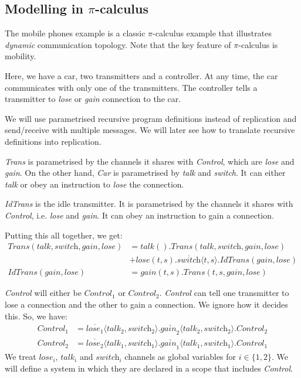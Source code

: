 \documentclass[a4paper, openany]{memoir}
\theoremstyle{definition}
\begin{document}
    \subsection{Modelling in $\pi$-calculus}
    The mobile phones example is a classic $\pi$-calculus example that illustrates \emph{dynamic} communication topology. Note that the key feature of $\pi$-calculus is mobility.

    Here, we have a car, two transmitters and a controller. At any time, the car communicates with only one of the transmitters. The controller tells a transmitter to \textit{lose} or \textit{gain} connection to the car.


    We will use parametrised recursive program definitions instead of replication and send/receive with multiple messages. We will later see how to translate recursive definitions into replication. 
    
    \textit{Trans} is parametrised by the channels it shares with \textit{Control}, which are \textit{lose} and \textit{gain}. On the other hand, \textit{Car} is parametrised by \textit{talk} and \textit{switch}. It can either \textit{talk} or obey an instruction to \textit{lose} the connection.

    \textit{IdTrans} is the idle transmitter. It is parametrised by the channels it shares with \textit{Control}, i.e. \textit{lose} and \textit{gain}. It can obey an instruction to gain a connection.

    Putting this all together, we get:
    \begin{align*}
        \textit{Trans}(\textit{talk}, \textit{switch}, \textit{gain}, \textit{lose}) &= \textit{talk}().\textit{Trans}(\textit{talk}, \textit{switch}, \textit{gain}, \textit{lose}) \\
        &+ \textit{lose}(t, s).\overline{\textit{switch}}\langle t, s \rangle.\textit{IdTrans}(\textit{gain}, \textit{lose}) \\
        \textit{IdTrans}(\textit{gain}, \textit{lose}) &= \textit{gain}(t, s).\textit{Trans}(t, s, \textit{gain}, \textit{lose})
    \end{align*}

    \textit{Control} will either be $\textit{Control}_1$ or $\textit{Control}_2$. \textit{Control} can tell one transmitter to lose a connection and the other to gain a connection. We ignore how it decides this. So, we have:
    \begin{align*}
        \textit{Control}_1 &= \overline{\textit{lose}_1} \langle \textit{talk}_2, \textit{switch}_2 \rangle.\overline{\textit{gain}_2} \langle \textit{talk}_2, \textit{switch}_2 \rangle.\textit{Control}_2 \\
        \textit{Control}_2 &= \overline{\textit{lose}_2} \langle \textit{talk}_1, \textit{switch}_1 \rangle.\overline{\textit{gain}_1} \langle \textit{talk}_1, \textit{switch}_1 \rangle.\textit{Control}_1
    \end{align*}
    We treat $\textit{lose}_i$, $\textit{talk}_i$ and $\textit{switch}_i$ channels as global variables for $i \in \{1, 2\}$. We will define a system in which they are declared in a scope that includes \textit{Control}.
\end{document}
